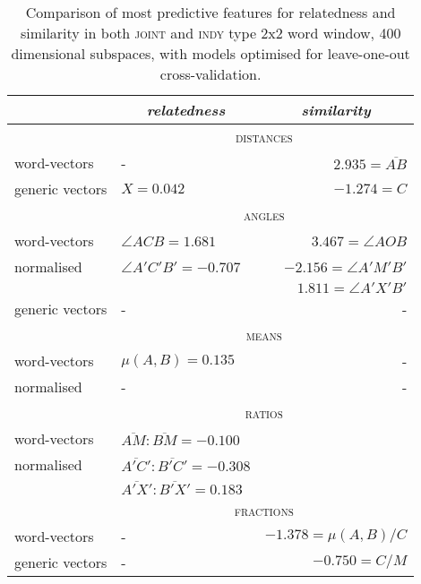 \begin{table}
\centering
\begin{tabular}{llr}
\hline
& \multicolumn{1}{c}{\emph{relatedness}} & \multicolumn{1}{c}{\emph{similarity}} \\
\hline
& \multicolumn{2}{c}{\textsc{distances}} \\
word-vectors & - & $2.935 = \overline{AB}$ \\
generic vectors & $X = 0.042$ & $-1.274 = C$ \\
\hline
& \multicolumn{2}{c}{\textsc{angles}} \\
word-vectors & $\angle ACB = 1.681$ & $3.467 = \angle AOB$ \\
normalised & $\angle A'C'B' = -0.707$ & $-2.156 = \angle A'M'B'$ \\
& & $1.811 = \angle A'X'B'$ \\
generic vectors & - & - \\
\hline
& \multicolumn{2}{c}{\textsc{means}} \\
word-vectors & $\mu(A,B) = 0.135$ & - \\
normalised & - & - \\
\hline
& \multicolumn{2}{c}{\textsc{ratios}} \\
word-vectors & $\overline{AM}:\overline{BM} = -0.100$ \\
normalised & $\overline{A'C'}:\overline{B'C'} = -0.308$ \\
& $\overline{A'X'}:\overline{B'X'} = 0.183$ \\
\hline
& \multicolumn{2}{c}{\textsc{fractions}} \\
word-vectors & - & $-1.378 = \mu(A,B)/C$ \\
generic vectors & - & $-0.750 = C/M$ \\
\hline
\end{tabular}
\caption[Comparing Optimal Features for Relatedness and Similarity]{Comparison of most predictive features for relatedness and similarity in both \textsc{joint} and \textsc{indy} type 2x2 word window, 400 dimensional subspaces, with models optimised for leave-one-out cross-validation.}
\label{tab:features}
\end{table}

